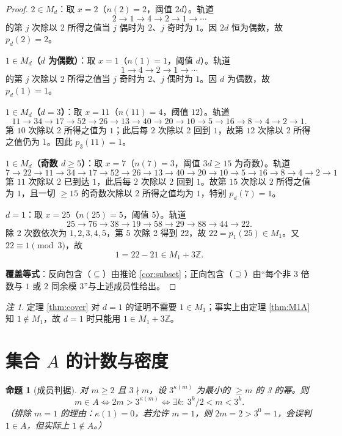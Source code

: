 \documentclass[11pt]{article}
\newtheorem{proposition}[theorem]{命题}
\theoremstyle{definition}
\theoremstyle{definition}
\theoremstyle{remark}
\newtheorem{remark}[theorem]{注}
\begin{document}
\begin{proof}
\textbf{\(2\in M_d\)}：取 \(x=2\)（\(n(2)=2\)，阈值 \(2d\)）。轨道
\[
2\to1\to4\to2\to1\to\cdots
\]
的第 \(j\) 次除以 2 所得之值当 \(j\) 偶时为 \(2\)、\(j\) 奇时为 \(1\)。因 \(2d\) 恒为偶数，故 \(p_d(2)=2\)。

\textbf{\(1\in M_d\)（\(d\) 为偶数）}：取 \(x=1\)（\(n(1)=1\)，阈值 \(d\)）。轨道
\[
1\to4\to2\to1\to\cdots
\]
的第 \(j\) 次除以 2 所得之值当 \(j\) 奇时为 \(2\)、\(j\) 偶时为 \(1\)。因 \(d\) 为偶数，故 \(p_d(1)=1\)。

\textbf{\(1\in M_d\)（\(d=3\)）}：取 \(x=11\)（\(n(11)=4\)，阈值 \(12\)）。轨道
\[
11\to34\to17\to52\to26\to13\to40\to20\to10\to5\to16\to8\to4\to2\to1.
\]
第 \(10\) 次除以 2 所得之值为 \(1\)；此后每 \(2\) 次除以 2 回到 \(1\)，故第 \(12\) 次除以 2 所得之值仍为 \(1\)。因此 \(p_3(11)=1\)。

\textbf{\(1\in M_d\)（奇数 \(d\ge5\)）}：取 \(x=7\)（\(n(7)=3\)，阈值 \(3d\ge15\) 为奇数）。轨道
\[
7\to22\to11\to34\to17\to52\to26\to13\to40\to20\to10\to5\to16\to8\to4\to2\to1
\]
第 \(11\) 次除以 2 已到达 \(1\)，此后每 \(2\) 次除以 2 回到 \(1\)。故第 \(15\) 次除以 2 所得之值为 \(1\)，且一切 \(\ge15\) 的奇数次除以 2 所得之值均为 \(1\)，特别 \(p_d(7)=1\)。

\textbf{\(d=1\)}：取 \(x=25\)（\(n(25)=5\)，阈值 \(5\)）。轨道
\[
25\to76\to38\to19\to58\to29\to88\to44\to22.
\]
除 2 次数依次为 \(1,2,3,4,5\)，第 \(5\) 次除 2 得到 \(22\)，故 \(22=p_1(25)\in M_1\)。又 \(22\equiv1\pmod3\)，故
\[
1=22-21\in M_1+3\mathbb Z.
\]

\textbf{覆盖等式}：反向包含（\(\subseteq\)）由推论 \ref{cor:subset}；正向包含（\(\supseteq\)）由“每个非 3 倍数与 \(1\) 或 \(2\) 同余模 3”与上述成员性给出。
\end{proof}

\begin{remark}
定理 \ref{thm:cover} 对 \(d=1\) 的证明不需要 \(1\in M_1\)；事实上由定理 \ref{thm:M1A} 知 \(1\notin M_1\)，故 \(d=1\) 时只能用 \(1\in M_1+3\mathbb Z\)。
\end{remark}

\section{集合 \(A\) 的计数与密度}

\begin{proposition}[成员判据]\label{prop:kappa}
对 \(m\ge2\) 且 \(3\nmid m\)，设 \(3^{\kappa(m)}\) 为最小的 \(\ge m\) 的 3 的幂。则
\[
m\in A\iff 2m>3^{\kappa(m)}\iff\exists k:\ 3^k/2<m<3^k.
\]
（排除 \(m=1\) 的理由：\(\kappa(1)=0\)，若允许 \(m=1\)，则 \(2m=2>3^0=1\)，会误判 \(1\in A\)，但实际上 \(1\notin A\)。）
\end{proposition}
\end{document}
